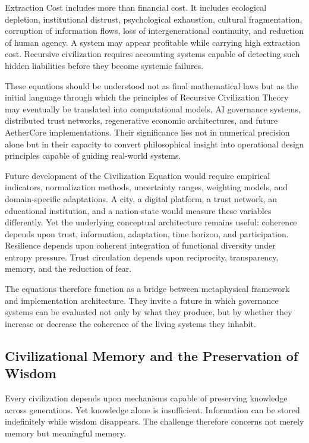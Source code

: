 \documentclass[12pt]{article}
\begin{document}
Extraction Cost includes more than financial cost. It includes ecological depletion, institutional distrust, psychological exhaustion, cultural fragmentation, corruption of information flows, loss of intergenerational continuity, and reduction of human agency. A system may appear profitable while carrying high extraction cost. Recursive civilization requires accounting systems capable of detecting such hidden liabilities before they become systemic failures.

These equations should be understood not as final mathematical laws but as the initial language through which the principles of Recursive Civilization Theory may eventually be translated into computational models, AI governance systems, distributed trust networks, regenerative economic architectures, and future AetherCore implementations. Their significance lies not in numerical precision alone but in their capacity to convert philosophical insight into operational design principles capable of guiding real-world systems.

Future development of the Civilization Equation would require empirical indicators, normalization methods, uncertainty ranges, weighting models, and domain-specific adaptations. A city, a digital platform, a trust network, an educational institution, and a nation-state would measure these variables differently. Yet the underlying conceptual architecture remains useful: coherence depends upon trust, information, adaptation, time horizon, and participation. Resilience depends upon coherent integration of functional diversity under entropy pressure. Trust circulation depends upon reciprocity, transparency, memory, and the reduction of fear.

The equations therefore function as a bridge between metaphysical framework and implementation architecture. They invite a future in which governance systems can be evaluated not only by what they produce, but by whether they increase or decrease the coherence of the living systems they inhabit.

\subsection{Civilizational Memory and the Preservation of Wisdom}

Every civilization depends upon mechanisms capable of preserving knowledge across generations. Yet knowledge alone is insufficient. Information can be stored indefinitely while wisdom disappears. The challenge therefore concerns not merely memory but meaningful memory.
\end{document}
